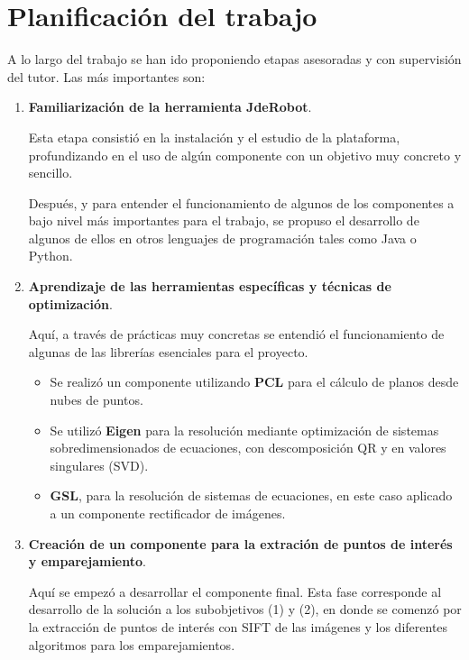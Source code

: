 \section{Planificación del trabajo}

A lo largo del trabajo se han ido proponiendo etapas asesoradas y con supervisión del tutor. Las más importantes son:

\begin{enumerate}

\item \textbf{Familiarización de la herramienta JdeRobot}.

Esta etapa consistió en la instalación y el estudio de la plataforma, profundizando en el uso de algún componente con un objetivo muy concreto y sencillo.

Después, y para entender el funcionamiento de algunos de los componentes a bajo nivel más importantes para el trabajo, se propuso el desarrollo de algunos de ellos en otros lenguajes de programación tales como Java o Python.

\item \textbf{Aprendizaje de las herramientas específicas y técnicas de optimización}.

Aquí, a través de prácticas muy concretas se entendió el funcionamiento de algunas de las librerías esenciales para el proyecto.

\begin{itemize}

\item Se realizó un componente utilizando \textbf{PCL} para el cálculo de planos desde nubes de puntos.

\item Se utilizó \textbf{Eigen} para la resolución mediante optimización de sistemas sobredimensionados de ecuaciones, con descomposición QR y en valores singulares (SVD).

\item \textbf{GSL}, para la resolución de sistemas de ecuaciones, en este caso aplicado a un componente rectificador de imágenes.

\end{itemize}

\item \textbf{Creación de un componente para la extración de puntos de interés y emparejamiento}.

Aquí se empezó a desarrollar el componente final. Esta fase corresponde al desarrollo de la solución a los subobjetivos (1) y (2), en donde se comenzó por la extracción de puntos de interés con SIFT de las imágenes y los diferentes algoritmos para los emparejamientos.


\end{enumerate}
